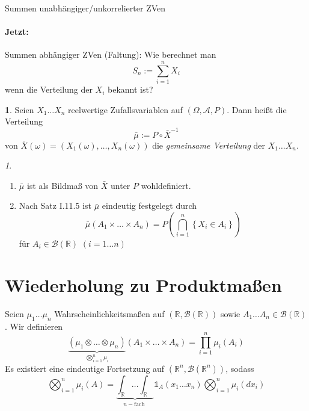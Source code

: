 \documentclass[10pt,a4paper]{report}
\numberwithin{equation}{section}
\numberwithin{figure}{section}
\theoremstyle{plain}
\theoremstyle{definition}
\newtheorem{defn}[thm]{\protect\definitionname}
\theoremstyle{remark}
\newtheorem{rem}[thm]{\protect\remarkname}
\theoremstyle{plain}
\providecommand{\definitionname}{Definition}
\providecommand{\remarkname}{Bemerkung}
\newcommand{\1}{ \mathbb{1} } %
\begin{document}
Summen unabhängiger/unkorrelierter ZVen


\paragraph*{Jetzt:}

Summen abhängiger ZVen (Faltung): Wie berechnet man 
\[
S_{n}:=\sum_{i=1}^{n}X_{i}
\]
wenn die Verteilung der $X_{i}$ bekannt ist?
\begin{defn}
Seien $X_{1}\ldots X_{n}$ reelwertige Zufallsvariablen auf $\left(\Omega,\mathcal{A},P\right)$.
Dann heißt die Verteilung 
\[
\bar{\mu}:=P\circ\bar{X}^{-1}
\]
von $\bar{X}\left(\omega\right)=\left(X_{1}\left(\omega\right),\ldots,X_{n}\left(\omega\right)\right)$
die \emph{gemeinsame Verteilung} der
$X_{1}\ldots X_{n}$.
\end{defn}
\begin{rem}
 \ 
\begin{enumerate}
\item $\bar{\mu}$ ist als Bildmaß von $\bar{X}$ unter $P$ wohldefiniert.
\item Nach Satz I.11.5 ist $\bar{\mu}$ eindeutig festgelegt durch
\[
\bar{\mu}\left(A_{1}\times\ldots\times A_{n}\right)=P\left(\bigcap_{i=1}^{n}\left\{ X_{i}\in A_{i}\right\} \right)
\]
für $A_{i}\in\mathcal{B}\left(\mathbb{R}\right)$ $\left(i=1\ldots n\right)$ 
\end{enumerate}
\end{rem}

\section*{Wiederholung zu Produktmaßen}

Seien $\mu_{1}\ldots\mu_{n}$ Wahrscheinlichkeitsmaßen auf $\left(\mathbb{R},\mathcal{B}\left(\mathbb{R}\right)\right)$
sowie $A_{1}\ldots A_{n}\in\mathcal{B}\left(\mathbb{R}\right)$. Wir
definieren 
\[
\underset{\bigotimes_{i=1}^{n}\mu_{i}}{\underbrace{\left(\mu_{1}\otimes\ldots\otimes\mu_{n}\right)}}\left(A_{1}\times\ldots\times A_{n}\right)=\prod_{i=1}^{n}\mu_{i}\left(A_{i}\right)
\]
Es existiert eine eindeutige Fortsetzung auf $\left(\mathbb{R}^{n},\mathcal{B}\left(\mathbb{R}^{n}\right)\right)$,
sodass 
\[
\bigotimes_{i=1}^{n}\mu_{i}\left(A\right)=\underset{n-\text{fach }}{\underbrace{\int_{\mathbb{R}}\ldots\int_{\mathbb{R}}}}\1_{A}\left(x_{1}\ldots x_{n}\right)\bigotimes_{i=1}^{n}\mu_{i}\left(dx_{i}\right)
\]
\end{document}
